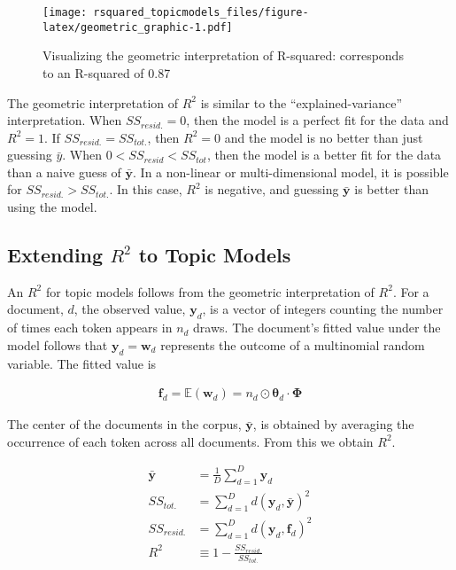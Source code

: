 \documentclass[conference,final,]{IEEEtran}
\makeatletter
\def\maxwidth{\ifdim\Gin@nat@width>\linewidth\linewidth
\else\Gin@nat@width\fi}
\let\Oldincludegraphics\includegraphics
\renewcommand{\includegraphics}[1]{\Oldincludegraphics[width=\maxwidth]{#1}}
\makeatother
\begin{document}
\begin{figure}
\centering
\texttt{[image: rsquared\_topicmodels\_files/figure-latex/geometric\_graphic-1.pdf]}
\caption{Visualizing the geometric interpretation of R-squared:
corresponds to an R-squared of 0.87}
\end{figure}

The geometric interpretation of \(R^2\) is similar to the
``explained-variance'' interpretation. When \(SS_{resid.} = 0\), then
the model is a perfect fit for the data and \(R^2 = 1\). If
\(SS_{resid.} = SS_{tot.}\), then \(R^2 = 0\) and the model is no better
than just guessing \(\bar{y}\). When \(0 < SS_{resid} < SS_{tot}\), then
the model is a better fit for the data than a naive guess of
\(\bar{\mathbf{y}}\). In a non-linear or multi-dimensional model, it is
possible for \(SS_{resid.} > SS_{tot.}\). In this case, \(R^2\) is
negative, and guessing \(\bar{\mathbf{y}}\) is better than using the
model.

\hypertarget{extending-r2-to-topic-models}{%
\subsection{\texorpdfstring{Extending \(R^2\) to Topic
Models}{Extending R\^{}2 to Topic Models}}\label{extending-r2-to-topic-models}}

An \(R^2\) for topic models follows from the geometric interpretation of
\(R^2\). For a document, \(d\), the observed value, \(\mathbf{y}_d\), is
a vector of integers counting the number of times each token appears in
\(n_d\) draws. The document's fitted value under the model follows that
\(\mathbf{y}_d = \mathbf{w}_d\) represents the outcome of a multinomial
random variable. The fitted value is

\begin{align}
  \mathbf{f}_d = 
    \mathbb{E}(\mathbf{w}_d) = 
    n_d \odot \boldsymbol\theta_d \cdot \boldsymbol\Phi 
\end{align}

The center of the documents in the corpus, \(\bar{\mathbf{y}}\), is
obtained by averaging the occurrence of each token across all documents.
From this we obtain \(R^2\).

\begin{align}
    \bar{\mathbf{y}} &= \frac{1}{D}\sum_{d=1}^{D}\mathbf{y}_d\\
    SS_{tot.} &= \sum_{d=1}^D{d(\mathbf{y}_d, \bar{\mathbf{y}})^2}\\
    SS_{resid.} &= \sum_{d=1}^D{d(\mathbf{y}_d, \mathbf{f}_d)^2}\\
    R^2 &\equiv 1 - \frac{SS_{resid.}}{SS_{tot.} }
\end{align}
\end{document}
